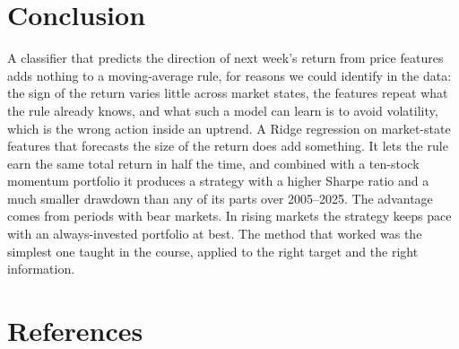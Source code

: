 \documentclass[11pt]{article}
\begin{document}
\section{Conclusion}

A classifier that predicts the direction of next week's return from price features adds nothing to a moving-average rule, for reasons we could identify in the data: the sign of the return varies little across market states, the features repeat what the rule already knows, and what such a model can learn is to avoid volatility, which is the wrong action inside an uptrend. A Ridge regression on market-state features that forecasts the size of the return does add something. It lets the rule earn the same total return in half the time, and combined with a ten-stock momentum portfolio it produces a strategy with a higher Sharpe ratio and a much smaller drawdown than any of its parts over 2005--2025. The advantage comes from periods with bear markets. In rising markets the strategy keeps pace with an always-invested portfolio at best. The method that worked was the simplest one taught in the course, applied to the right target and the right information.

\section*{References}
\end{document}
